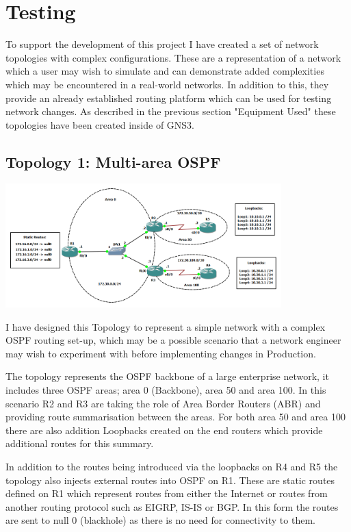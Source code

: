\documentclass[11pt]{report}
\begin{document}
\chapter{Testing}

To support the development of this project I have created a set of network topologies with complex configurations. These are a representation of a network which a user may wish to simulate and can demonstrate added complexities which may be encountered in a real-world networks. In addition to this, they provide an already established routing platform which can be used for testing network changes. As described in the previous section "Equipment Used" these topologies have been created inside of GNS3.

\section{Topology 1: Multi-area OSPF}

\begin{center}
\includegraphics[width=0.8\textwidth]{OSPF-Topology.png}
\end{center}

I have designed this Topology to represent a simple network with a complex OSPF routing set-up, which may be a possible scenario that a network engineer may wish to experiment with before implementing changes in Production.

The topology represents the OSPF backbone of a large enterprise network, it includes three OSPF areas; area 0 (Backbone), area 50 and area 100. In this scenario R2 and R3 are taking the role of Area Border Routers (ABR) and providing route summarisation between the areas. For both area 50 and area 100 there are also addition Loopbacks created on the end routers which provide additional routes for this summary.

In addition to the routes being introduced via the loopbacks on R4 and R5 the topology also injects external routes into OSPF on R1. These are static routes defined on R1 which represent routes from either the Internet or routes from another routing protocol such as EIGRP, IS-IS or BGP. In this form the routes are sent to null 0 (blackhole) as there is no need for connectivity to them.
\end{document}

